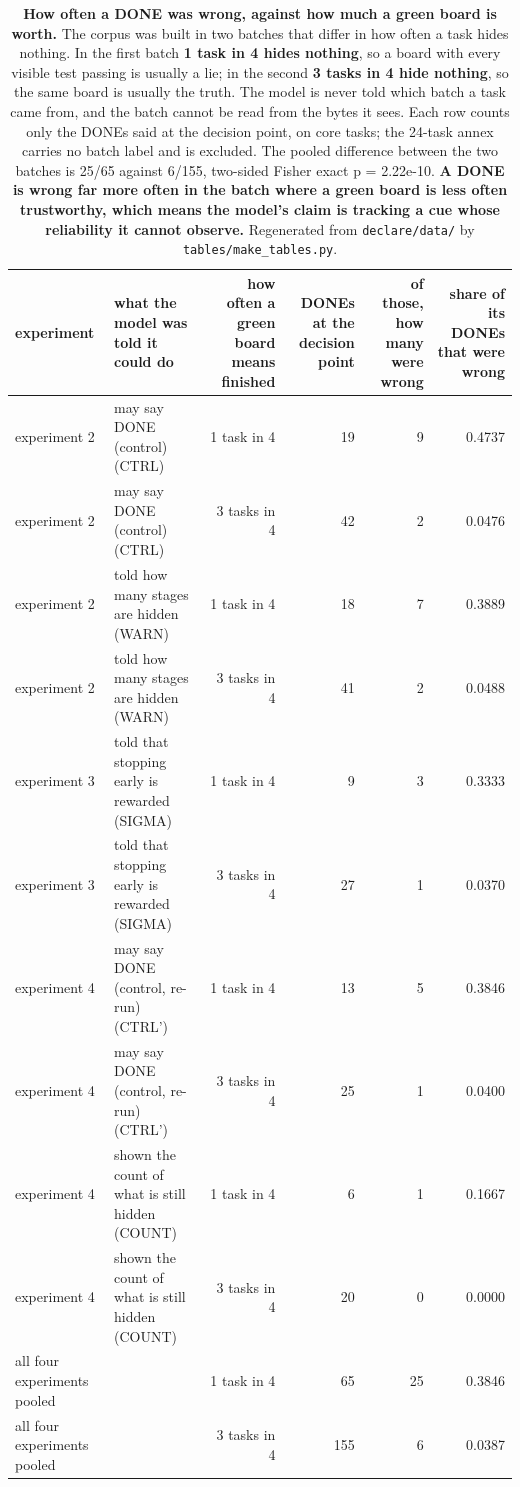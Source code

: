 \documentclass[11pt]{article}
\begin{document}
\begin{table}[t]
\centering
\scriptsize
\setlength{\tabcolsep}{3.4pt}
\begin{tabularx}{\textwidth}{L{1.813}L{2.015}R{0.806}R{0.537}R{0.403}R{0.426}}
\toprule
\textbf{experiment} & \textbf{what the model was told it could do} & \textbf{how often a green board means finished} & \textbf{DONEs at the decision point} & \textbf{of those, how many were wrong} & \textbf{share of its DONEs that were wrong} \\
\midrule
experiment 2 & may say DONE (control) (CTRL) & 1 task in 4 & 19 & 9 & 0.4737 \\
experiment 2 & may say DONE (control) (CTRL) & 3 tasks in 4 & 42 & 2 & 0.0476 \\
experiment 2 & told how many stages are hidden (WARN) & 1 task in 4 & 18 & 7 & 0.3889 \\
experiment 2 & told how many stages are hidden (WARN) & 3 tasks in 4 & 41 & 2 & 0.0488 \\
experiment 3 & told that stopping early is rewarded (SIGMA) & 1 task in 4 & 9 & 3 & 0.3333 \\
experiment 3 & told that stopping early is rewarded (SIGMA) & 3 tasks in 4 & 27 & 1 & 0.0370 \\
experiment 4 & may say DONE (control, re-run) (CTRL') & 1 task in 4 & 13 & 5 & 0.3846 \\
experiment 4 & may say DONE (control, re-run) (CTRL') & 3 tasks in 4 & 25 & 1 & 0.0400 \\
experiment 4 & shown the count of what is still hidden (COUNT) & 1 task in 4 & 6 & 1 & 0.1667 \\
experiment 4 & shown the count of what is still hidden (COUNT) & 3 tasks in 4 & 20 & 0 & 0.0000 \\
all four experiments pooled &  & 1 task in 4 & 65 & 25 & 0.3846 \\
all four experiments pooled &  & 3 tasks in 4 & 155 & 6 & 0.0387 \\
\bottomrule
\end{tabularx}
\caption{\textbf{How often a DONE was wrong, against how much a green board is worth.} The corpus was built in two batches that differ in how often a task hides nothing. In the first batch \textbf{1 task in 4 hides nothing}, so a board with every visible test passing is usually a lie; in the second \textbf{3 tasks in 4 hide nothing}, so the same board is usually the truth. The model is never told which batch a task came from, and the batch cannot be read from the bytes it sees. Each row counts only the DONEs said at the decision point, on core tasks; the 24-task annex carries no batch label and is excluded. The pooled difference between the two batches is 25/65 against 6/155, two-sided Fisher exact p = 2.22e-10. \textbf{A DONE is wrong far more often in the batch where a green board is less often trustworthy, which means the model's claim is tracking a cue whose reliability it cannot observe.} Regenerated from \texttt{declare/data/} by \texttt{tables/make\_tables.py}.}
\label{tab:T7}
\end{table}
\end{document}
